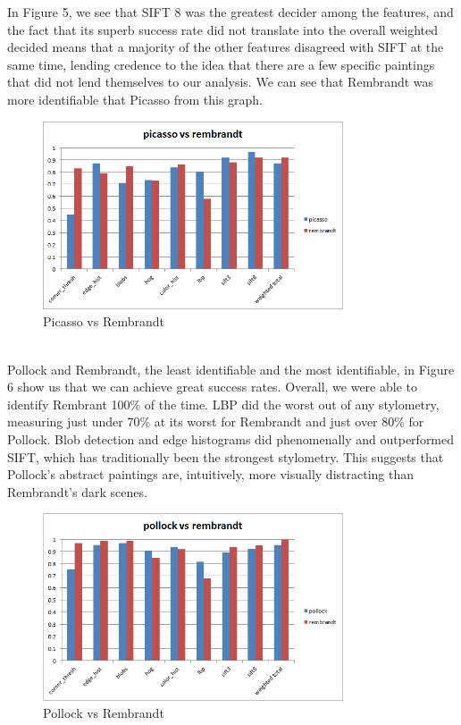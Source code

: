 \documentclass{article}
\begin{document}
  In Figure 5, we see that SIFT 8 was the greatest decider among the features,
  and the fact that its superb success rate did not translate into the overall
  weighted decided means that a majority of the other features disagreed with
  SIFT at the same time, lending credence to the idea that there are a few
  specific paintings that did not lend themselves to our analysis. We can see
  that Rembrandt was more identifiable that Picasso from this graph.
  \begin{figure}[h!]
    \begin{center}
      \includegraphics[width=3.5in]{graphs/picasso_rembrandt.png}
      \caption{Picasso vs Rembrandt}
    \end{center}
  \end{figure} \\

  Pollock and Rembrandt, the least identifiable and the most identifiable, in
  Figure 6 show us that we can achieve great success rates. Overall, we were
  able to identify Rembrant 100\% of the time. LBP did the worst out of any
  stylometry, measuring just under 70\% at its worst for Rembrandt and just over
  80\% for Pollock. Blob detection and edge histograms did phenomenally and
  outperformed SIFT, which has traditionally been the strongest stylometry. This
  suggests that Pollock's abstract paintings are, intuitively, more visually
  distracting than Rembrandt's dark scenes.
  \begin{figure}[h!]
    \begin{center}
      \includegraphics[width=3.5in]{graphs/pollock_rembrandt.png}
      \caption{Pollock vs Rembrandt}
    \end{center}
  \end{figure} \\
\end{document}
